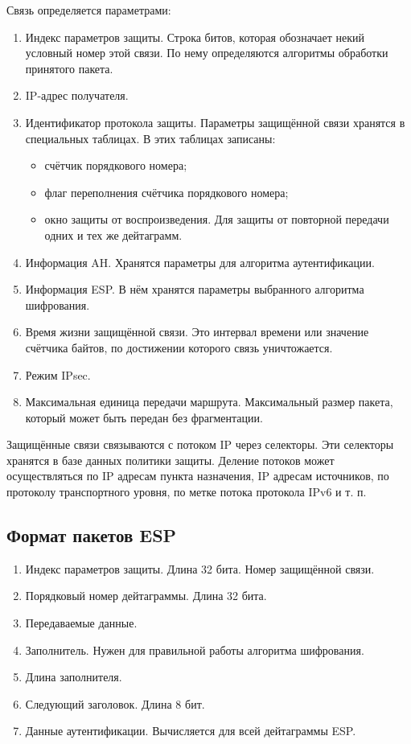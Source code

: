 \documentclass[12pt, russian, oneside, article]{ncc}
\begin{document}
Связь определяется параметрами:
\begin{enumerate}
\item Индекс параметров защиты. Строка битов, которая обозначает некий условный номер этой связи. По нему определяются алгоритмы обработки принятого пакета.
\item IP-адрес получателя.
\item Идентификатор протокола защиты. Параметры защищённой связи хранятся в специальных таблицах. В этих таблицах записаны:

\begin{itemize}
\item счётчик порядкового номера;
\item флаг переполнения счётчика порядкового номера;
\item окно защиты от воспроизведения. Для защиты от повторной передачи одних и тех же дейтаграмм.
\end{itemize}

\item Информация AH. Хранятся параметры для алгоритма аутентификации.
\item Информация ESP. В нём хранятся параметры выбранного алгоритма шифрования.
\item Время жизни защищённой связи. Это интервал времени или значение счётчика байтов, по достижении которого связь уничтожается.
\item Режим IPsec.
\item Максимальная единица передачи маршрута. Максимальный размер пакета, который может быть передан без фрагментации.
\end{enumerate}

Защищённые связи связываются с потоком IP через селекторы. Эти селекторы хранятся в базе данных политики защиты. Деление потоков может осуществляться по IP адресам пункта назначения, IP адресам источников, по протоколу транспортного уровня, по метке потока протокола IPv6 и т. п.
\subsection{Формат пакетов ESP}
\label{sec-4_2}


\begin{enumerate}
\item Индекс параметров защиты. Длина 32 бита. Номер защищённой связи.
\item Порядковый номер дейтаграммы. Длина 32 бита.
\item Передаваемые данные.
\item Заполнитель. Нужен для правильной работы алгоритма шифрования.
\item Длина заполнителя.
\item Следующий заголовок. Длина 8 бит.
\item Данные аутентификации. Вычисляется для всей дейтаграммы ESP.
\end{enumerate}
\end{document}
